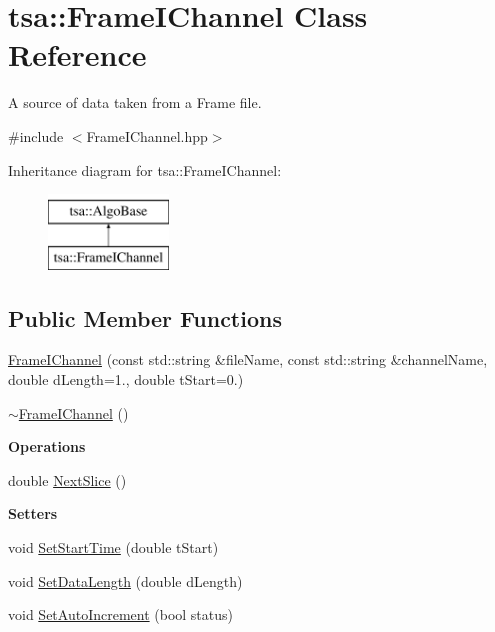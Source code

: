\hypertarget{classtsa_1_1_frame_i_channel}{}\section{tsa\+:\+:Frame\+I\+Channel Class Reference}
\label{classtsa_1_1_frame_i_channel}


A source of data taken from a Frame file.  




{\ttfamily \#include $<$Frame\+I\+Channel.\+hpp$>$}

Inheritance diagram for tsa\+:\+:Frame\+I\+Channel\+:\begin{figure}[H]
\begin{center}
\leavevmode
\includegraphics[height=2.000000cm]{classtsa_1_1_frame_i_channel}
\end{center}
\end{figure}
\subsection*{Public Member Functions}
\begin{DoxyCompactItemize}
\item 
\hyperlink{classtsa_1_1_frame_i_channel_acc55687d86116d3cc2db6c4d2b2e7c1e}{Frame\+I\+Channel} (const std\+::string \&file\+Name, const std\+::string \&channel\+Name, double d\+Length=1., double t\+Start=0.)
\item 
\hyperlink{classtsa_1_1_frame_i_channel_ab6f4fd4a65dee05ef58590ed6216408c}{$\sim$\+Frame\+I\+Channel} ()
\end{DoxyCompactItemize}
\begin{Indent}\textbf{ Operations}\par
\begin{DoxyCompactItemize}
\item 
double \hyperlink{classtsa_1_1_frame_i_channel_a8caf984495dce2862909b0d7192c9fb4}{Next\+Slice} ()
\end{DoxyCompactItemize}
\end{Indent}
\begin{Indent}\textbf{ Setters}\par
\begin{DoxyCompactItemize}
\item 
void \hyperlink{classtsa_1_1_frame_i_channel_ae637a0e659963fa2ef3e5ab057d17509}{Set\+Start\+Time} (double t\+Start)
\item 
void \hyperlink{classtsa_1_1_frame_i_channel_a9e2483d3942bf13922ee4afa065f4da1}{Set\+Data\+Length} (double d\+Length)
\item 
void \hyperlink{classtsa_1_1_frame_i_channel_a7ef54c22707b58caa5d4174dfccffc26}{Set\+Auto\+Increment} (bool status)
\end{DoxyCompactItemize}
\end{Indent}
